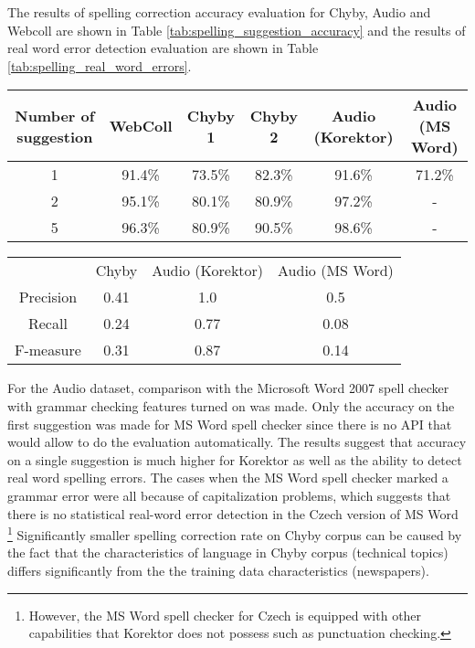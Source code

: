 \documentclass[11pt]{article}
\begin{document}
The results of spelling correction accuracy evaluation for Chyby, Audio and Webcoll are shown in Table \ref{tab:spelling_suggestion_accuracy} and
the results of real word error detection evaluation are shown in Table \ref{tab:spelling_real_word_errors}.
%
\begin{table*}
    \begin{center}
    \begin{tabular}{ c || c | c | c | c | c}
        Number of suggestion & WebColl & Chyby 1 & Chyby 2 & Audio (Korektor) & Audio (MS Word)\\
        \hline
        1 & 91.4\% & 73.5\% & 82.3\% & 91.6\% & 71.2\%\\
        2 & 95.1\% & 80.1\% & 80.9\% & 97.2\% & -\\
        5 & 96.3\% & 80.9\% & 90.5\% & 98.6\% & -\\
    \end{tabular}
    \end{center}
    \caption{Spelling correction rates achieved on the different datasets.
    For the Chyby corpus, two measurements were taken. In \emph{Chyby 1}, all
    spelling errors are considered. For the \emph{Chyby 2}, only those spelling
    errors for which an appropriate correct version is in the lexicon are taken into
    account.}
    \label{tab:spelling_suggestion_accuracy}
\end{table*}
%
\begin{table*}
    \begin{center}
    \begin{tabular}{ c || c | c | c }
        & Chyby & Audio (Korektor) & Audio (MS Word)\\
        Precision & 0.41 & 1.0 & 0.5\\
        Recall & 0.24 & 0.77 & 0.08\\
        F-measure & 0.31 & 0.87 & 0.14\\
    \end{tabular}
    \end{center}
    \caption{Real word error correction statistics for Audio dataset and Chyby corpus.}
    \label{tab:spelling_real_word_errors}
\end{table*}
%
For the Audio dataset, comparison with the Microsoft Word 2007
spell checker with grammar checking features turned on was made. Only the
accuracy on the first suggestion was made for MS Word spell checker since there
is no API that would allow to do the evaluation automatically. The results
suggest that accuracy on a single suggestion is much higher for Korektor as well as
the ability to detect real word spelling errors. The cases when the MS Word
spell checker marked a grammar error were all because of capitalization
problems, which suggests that there is no statistical real-word error detection
in the Czech version of MS Word \footnote{However, the MS Word spell checker for
Czech is equipped with other capabilities that Korektor does not possess such as
punctuation checking.}
Significantly smaller spelling correction rate on Chyby corpus can be caused
by the fact that the characteristics of language in Chyby corpus (technical topics)
differs significantly from the the training data characteristics (newspapers).
\end{document}
